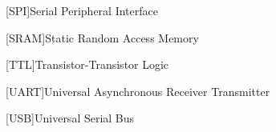 \begin{acronym}
	[SPI]{Serial Peripheral Interface}
\end{acronym}

\begin{acronym}
	[SRAM]{Static Random Access Memory}
\end{acronym}

\begin{acronym}
	[TTL]{Transistor-Transistor Logic}
\end{acronym}

\begin{acronym}
	[UART]{Universal Asynchronous Receiver Transmitter}
\end{acronym}

\begin{acronym}
	[USB]{Universal Serial Bus}
\end{acronym}









